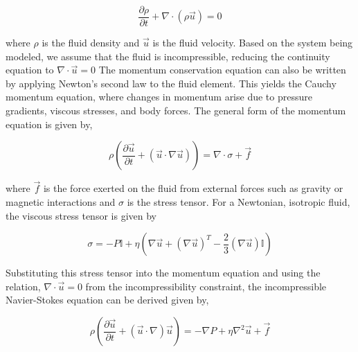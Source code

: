 \begin{equation}
    \frac{\partial\rho}{\partial t} + \nabla\cdot\left(\rho\vec{u}\right) = 0
\end{equation}

where $\rho$ is the fluid density and $\vec{u}$ is the fluid velocity. Based on the system being modeled, we assume that the fluid is incompressible, reducing the continuity equation to
$\nabla\cdot \vec{u} = 0$ The momentum conservation equation can also be written by applying Newton's second law to the fluid element. This yields the Cauchy momentum equation, 
where changes in momentum arise due to pressure gradients, viscous stresses, and body forces. The general form of the momentum equation is given by,


\begin{equation}
    \rho \left( \frac{\partial \vec{u}}{\partial t} + (\vec{u}\cdot \nabla \vec{u})  \right) = \nabla \cdot \sigma + \vec{f}
\end{equation}

where $\vec{f}$ is the force exerted on the fluid from external forces such as gravity or magnetic interactions and $\sigma$ is the stress tensor. For a Newtonian, isotropic fluid, 
the viscous stress tensor is given by


\begin{equation}
    \sigma = -P\mathbb{I} + \eta\left( \nabla \vec{u} + (\nabla \vec{u})^T -\frac{2}{3}(\nabla \vec{u})\mathbb{I} \right)
\end{equation}

Substituting this stress tensor into the momentum equation and using the relation, $\nabla\cdot \vec{u} = 0$ from the incompressibility constraint, the incompressible 
Navier-Stokes equation can be derived given by,

\begin{equation}
    \rho \left(\frac{\partial\vec{u}}{\partial t} + (\vec{u}\cdot\nabla)\vec{u} \right) = -\nabla P + \eta \nabla^2 \vec{u} + \vec{f}
\end{equation}

